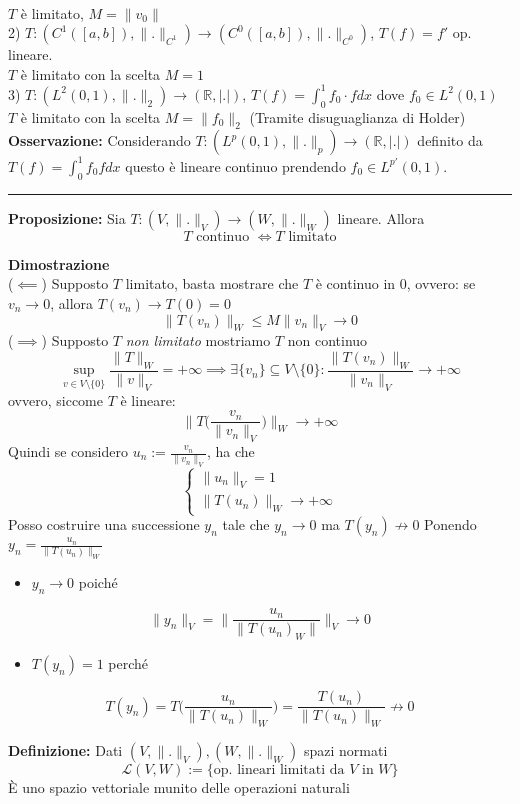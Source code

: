 \documentclass[a4paper]{article}
\newcommand{\R}{\mathbb{R}}
\newcommand{\divider}{\noindent\rule{\textwidth}{0.5pt}}
\begin{document}
\\$T$ è limitato, $M=\|v_0\|$ 
\\2) $T:(C^1([a,b]),\|.\|_{C^1})\to (C^0([a,b]),\|.\|_{C^0})$, $T(f)=f'$ op. lineare.
\\$T$ è limitato con la scelta $M=1$
\\3) $T:(L^{2}(0,1),\|.\|_2)\to (\R,|.|)$, $T(f)=\int_{0}^{1} f_0\cdot fdx $ dove $f_0\in L^{2}(0,1)$ 
\\$T$ è limitato con la scelta $M=\|f_0\|_2$ (Tramite disuguaglianza di Holder)
\\\textbf{Osservazione:} Considerando $T:(L^{p}(0,1),\|.\|_p)\to (\R,|.|)$ definito da $T(f)=\int_{0}^{1} f_0fdx $ questo è lineare continuo prendendo $f_0\in L^{p'}(0,1)$.
\\\divider
\begin{tcolorbox}
	\textbf{Proposizione: }Sia $T:(V,\|.\|_V)\to (W,\|.\|_W)$ lineare. Allora
	\[T\text{ continuo }\iff T \text{ limitato}\]
\end{tcolorbox}
\textbf{Dimostrazione} 
\\($\impliedby$) Supposto $T$ limitato, basta mostrare che $T$ è continuo in $0$, ovvero: se $v_n\to 0$, allora $T(v_n)\to T(0)=0$ 
\[\|T(v_n)\|_W\le M \|v_n\|_V\to 0\]
($\implies$) Supposto $T$ \emph{non limitato} mostriamo $T$ non continuo
\[\sup_{v\in V\setminus \{0\} }\frac{\|T\|_W}{\|v\|_V}=+\infty\implies \exists \{v_n\} \subseteq  V\setminus \{0\} :\frac{\|T(v_n)\|_W}{\|v_n\|_V}\to +\infty\]
ovvero, siccome $T$ è lineare:
\[\bigg\|T\bigg(\frac{v_n}{\|v_n\|_V}\bigg)\bigg\|_W\to +\infty\]
Quindi se considero $u_n:= \frac{v_n}{\|v_n\|_V}$, ha che 
\[\begin{cases}
	\|u_n\|_V=1\\
	\|T(u_n)\|_W\to +\infty
\end{cases}\]
Posso costruire una successione $y_n$ tale che $y_n\to 0$ ma $T(y_n)\not \to 0$
Ponendo $y_n= \frac{u_n}{\|T(u_n)\|_W}$
\begin{itemize}
	\item $y_n\to 0$ poiché 
\end{itemize}
\[\|y_n\|_V=\bigg\|\frac{u_n}{\|T(u_n)_W\|}\bigg\|_V\to 0\]
\begin{itemize}
	\item $T(y_n)=1$ perché
\end{itemize}
\[T(y_n)=T\bigg( \frac{u_n}{\|T(u_n)\|_W} \bigg)= \frac{T(u_n)}{\|T(u_n)\|_W}\not\to 0\]
\begin{tcolorbox}
	\textbf{Definizione: }Dati $(V,\|.\|_V),(W,\|.\|_W)$ spazi normati
	\[\mathcal L(V,W):=\{\text{op. lineari limitati da } V \text{ in }W\}\] 
	È uno spazio vettoriale munito delle operazioni naturali
\end{tcolorbox}
\end{document}

